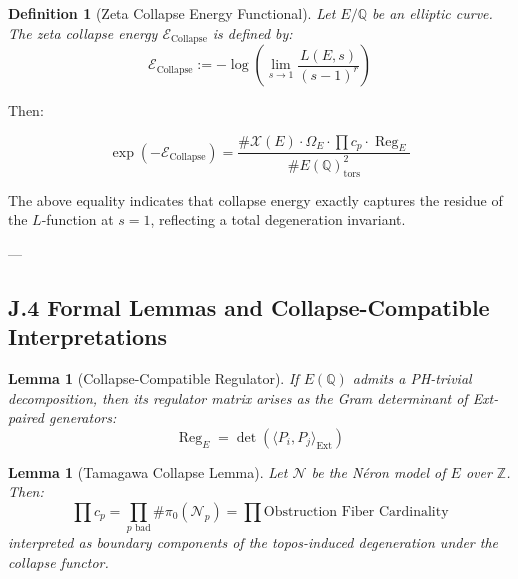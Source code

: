 \documentclass[11pt]{article}
\newtheorem{definition}[theorem]{Definition}
\newtheorem{lemma}[theorem]{Lemma}
\newcommand{\Sha}{\mathcal{X}}
\begin{document}
\begin{definition}[Zeta Collapse Energy Functional]
Let $E/\mathbb{Q}$ be an elliptic curve. The zeta collapse energy $\mathcal{E}_{\text{Collapse}}$ is defined by:
\[
\mathcal{E}_{\text{Collapse}} := -\log \left( \lim_{s \to 1} \frac{L(E,s)}{(s-1)^r} \right)
\]
\end{definition}

Then:

\[
\exp(-\mathcal{E}_{\text{Collapse}}) = \frac{\#\Sha(E)\cdot \Omega_E \cdot \prod c_p \cdot \operatorname{Reg}_E}{\# E(\mathbb{Q})_\text{tors}^2}
\]

The above equality indicates that collapse energy exactly captures the residue of the $L$-function at $s=1$, reflecting a total degeneration invariant.

---

\subsection*{J.4 Formal Lemmas and Collapse-Compatible Interpretations}

\begin{lemma}[Collapse-Compatible Regulator]
If $E(\mathbb{Q})$ admits a PH-trivial decomposition, then its regulator matrix arises as the Gram determinant of Ext-paired generators:
\[
\operatorname{Reg}_E = \det \left( \langle P_i, P_j \rangle_{\text{Ext}} \right)
\]
\end{lemma}

\begin{lemma}[Tamagawa Collapse Lemma]
Let $\mathcal{N}$ be the Néron model of $E$ over $\mathbb{Z}$. Then:
\[
\prod c_p = \prod_{p \text{ bad}} \#\pi_0(\mathcal{N}_p) = \prod \text{Obstruction Fiber Cardinality}
\]
interpreted as boundary components of the topos-induced degeneration under the collapse functor.
\end{lemma}
\end{document}
